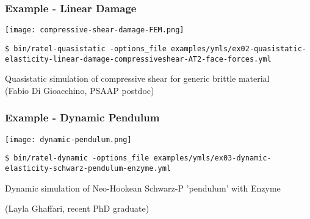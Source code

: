 \documentclass{beamer}
\begin{document}

\begin{frame}[fragile]
\begin{center}
\frametitle{Example - Linear Damage}

\texttt{[image: compressive-shear-damage-FEM.png]}

{\tiny
\begin{lstlisting}
$ bin/ratel-quasistatic -options_file examples/ymls/ex02-quasistatic-elasticity-linear-damage-compressiveshear-AT2-face-forces.yml
\end{lstlisting}
}

Quasistatic simulation of compressive shear for generic brittle material\\


(Fabio Di Gioacchino, PSAAP postdoc)

\end{center}
\end{frame}


\begin{frame}[fragile]
\begin{center}
\frametitle{Example - Dynamic Pendulum}

\texttt{[image: dynamic-pendulum.png]}

{\tiny
\begin{lstlisting}
$ bin/ratel-dynamic -options_file examples/ymls/ex03-dynamic-elasticity-schwarz-pendulum-enzyme.yml
\end{lstlisting}
}

Dynamic simulation of Neo-Hookean Schwarz-P 'pendulum' with Enzyme

(Layla Ghaffari, recent PhD graduate)

\end{center}
\end{frame}

\end{document}
